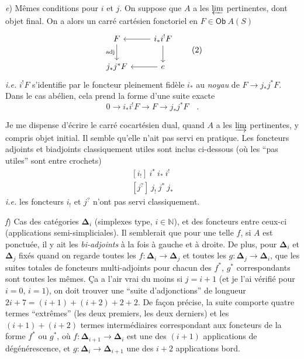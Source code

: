 \documentclass[11pt]{article}
\newcommand{\printedpage}[1]{\marginpar{\footnotesize p.~#1}}
\newcommand{\msp}[1]{\marginpar{\footnotesize [#1]}}
\newcommand{\Ob}{\mathsf{Ob}}
\newcommand{\bDelta}{\boldsymbol{\Delta}}
\begin{document}
\textit{e}) Mêmes conditions pour $i$ et $j$. On suppose que $A$ a les $\varprojlim$ pertinentes, dont objet final. On a alors un carré cartésien fonctoriel en $F\in \Ob\ A(S)$
\[
\begin{tikzcd}
F \arrow[d, "\text{adj}"'] & i_{*}i^{!}F \arrow[l] \arrow[d] \\
j_{*}j^{*}F & e \arrow[l]
\end{tikzcd}
\tag*{(2)}
\]
\textit{i.e.} $i^{!}F$ s'identifie par le foncteur pleinement fidèle $i_{*}$ au \textit{noyau} de $F\to j_{*}j^{*}F$. Dans le cas abélien, cela prend la forme d'une suite exacte
\[
0 \longrightarrow i_{*}i^{!}F \longrightarrow F \longrightarrow j_{*}j^{*}F \quad .
\]

\clearpage

\printedpage{3}

\msp{page 3}

Je me dispense d'écrire le carré cocartésien dual, quand $A$ a les $\varinjlim$ pertinentes, y compris objet initial. Il semble qu'elle n'ait pas servi en pratique. Les foncteurs adjoints et biadjoints classiquement utiles sont inclus ci-dessous (où les “pas utiles” sont entre crochets)
\[
\begin{aligned}
{}[i_{!}]\ i^{*}\ i_{*}\ i^{!} \\
[j^{?}]\ j_{!}\ j^{*}\ j_{*}
\end{aligned}
\]
\textit{i.e.} les foncteurs $i_{!}$ et $j^{?}$ n'ont pas servi classiquement.

\textit{f}) Cas des catégories $\bDelta_{i}$ (simplexes type, $i\in\mathbb{N}$), et des foncteurs entre ceux-ci (applications semi-simpliciales). Il semblerait que pour une telle $f$, si $A$ est ponctuée, il y ait les \textit{bi-adjoints} à la fois à gauche et à droite. De plus, pour $\bDelta_{i}$ et $\bDelta_{j}$ fixés quand on regarde toutes les $f:\bDelta_{i}\to\bDelta_{j}$ et toutes les $g:\bDelta_{j}\to\bDelta_{i}$, que les suites totales de foncteurs multi-adjoints pour chacun des $f^{*}$, $g^{*}$ correspondants sont toutes les mêmes. Ça a l'air vrai du moins si $j=i+1$ (et je l'ai vérifié pour $i=0$, $i=1$), on doit trouver une “suite d'adjonctions” de longueur $2i+7=(i+1)+(i+2)+2+2$. De façon précise, la suite comporte quatre termes “extrêmes” (les deux premiers, les deux derniers) et les $(i+1)+(i+2)$ termes intermédiaires correspondant aux foncteurs de la forme $f^{*}$ ou $g^{*}$, où $f:\bDelta_{i+1}\to\bDelta_{i}$ est une des $(i+1)$ applications de dégénérescence, et $g:\bDelta_{i}\to\bDelta_{i+1}$ une des $i+2$ applications bord.
\end{document}
